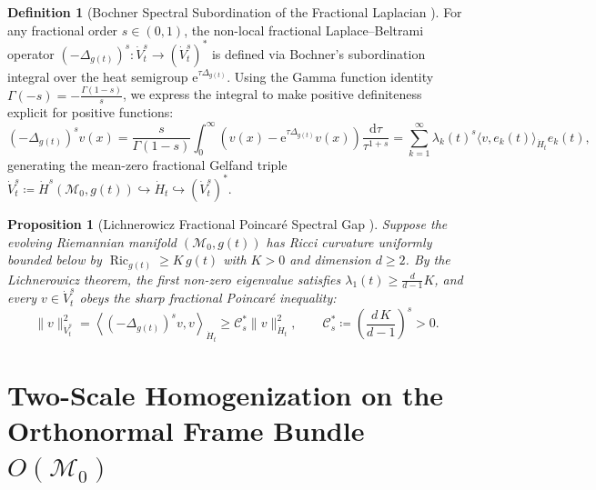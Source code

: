 \documentclass[11pt,a4paper,reqno]{article}
\newtheorem{proposition}[theorem]{Proposition}
\theoremstyle{definition}
\newtheorem{definition}[theorem]{Definition}
\theoremstyle{remark}
\begin{document}
\begin{definition}[Bochner Spectral Subordination of the Fractional Laplacian \cite{caffarelli2007extension, kwasnicki2017ten}]
For any fractional order $s \in (0, 1)$, the non-local fractional Laplace--Beltrami operator $(-\Delta_{g(t)})^s : \dot{V}_t^s \to (\dot{V}_t^s)^*$ is defined via Bochner's subordination integral over the heat semigroup $\mathrm{e}^{\tau \Delta_{g(t)}}$. Using the Gamma function identity $\Gamma(-s) = -\frac{\Gamma(1-s)}{s}$, we express the integral to make positive definiteness explicit for positive functions:
\begin{equation}\label{eq:bochner_subordination}
  (-\Delta_{g(t)})^s v(x) = \frac{s}{\Gamma(1-s)} \int_0^\infty \left( v(x) - \mathrm{e}^{\tau \Delta_{g(t)}} v(x) \right) \frac{\mathrm{d}\tau}{\tau^{1+s}} = \sum_{k=1}^\infty \lambda_k(t)^s \langle v, e_k(t) \rangle_{\dot{H}_t} e_k(t),
\end{equation}
generating the mean-zero fractional Gelfand triple $\dot{V}_t^s \coloneqq \dot{H}^s(\mathcal{M}_0, g(t)) \hookrightarrow \dot{H}_t \hookrightarrow (\dot{V}_t^s)^*$.
\end{definition}

\begin{proposition}[Lichnerowicz Fractional Poincar\'e Spectral Gap \cite{lichnerowicz1958geometrie, ananda2026stochastic_fluid_v2}]\label{prop:lichnerowicz_gap}
Suppose the evolving Riemannian manifold $(\mathcal{M}_0, g(t))$ has Ricci curvature uniformly bounded below by $\operatorname{Ric}_{g(t)} \ge K\,g(t)$ with $K > 0$ and dimension $d \ge 2$. By the Lichnerowicz theorem, the first non-zero eigenvalue satisfies $\lambda_1(t) \ge \frac{d}{d-1}K$, and every $v \in \dot{V}_t^s$ obeys the sharp fractional Poincar\'e inequality:
\begin{equation}\label{eq:fractional_poincare}
  \|v\|_{\dot{V}_t^s}^2 = \left\langle (-\Delta_{g(t)})^s v, v \right\rangle_{\dot{H}_t} \ge \mathcal{C}_s^* \|v\|_{\dot{H}_t}^2, \qquad \mathcal{C}_s^* \coloneqq \left( \frac{d\,K}{d-1} \right)^s > 0.
\end{equation}
\end{proposition}

\section[Two-Scale Homogenization on the Orthonormal Frame Bundle O(M0)]{Two-Scale Homogenization on the Orthonormal Frame Bundle $O(\mathcal{M}_0)$}
\end{document}
